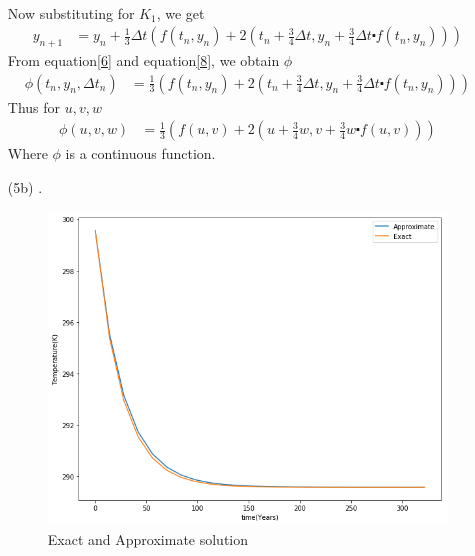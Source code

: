 \documentclass[12pt,a4paper]{article}
\begin{document}
\begin{itemize}
\begin{align*}
	\end{align*}
	Now substituting for $K_{1}$, we get
	\begin{align}
	y_{n+1}&=y_{n}+ \frac{1}{3}\Delta t\left(f(t_{n},y_{n})+2\left(t_{n}+\frac{3}{4} \Delta t,y_{n}+\frac{3}{4} \Delta t \centerdot f(t_{n},y_{n})\right)\right) \label{8}
	\end{align}
	From equation\ref{6} and equation\ref{8}, we obtain $\phi$
	\begin{align*}
	\phi(t_{n},y_{n},\Delta t_{n})&=\frac{1}{3}\left(f(t_{n},y_{n})+2\left(t_{n}+\frac{3}{4} \Delta t,y_{n}+\frac{3}{4} \Delta t \centerdot f(t_{n},y_{n})\right)\right)
	\end{align*}
	Thus for $u,v,w$
	\begin{align*}
	\phi(u,v,w)&=\frac{1}{3}\left(f(u,v)+2\left(u+\frac{3}{4} w,v+\frac{3}{4} w \centerdot f(u,v)\right)\right)
	\end{align*}
	Where $\phi$ is a continuous function.
	\newpage
	\item[(5b)]
	.\\
	\begin{figure}[h!]
		\centering
		\includegraphics[scale=0.5]{1.png}
		\caption{Exact and Approximate solution}
	\end{figure}
\end{itemize}
\end{document}
